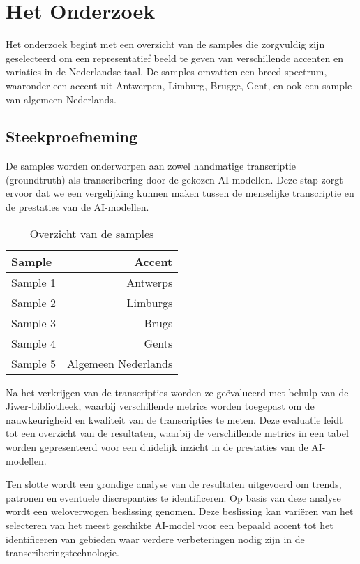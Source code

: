 
\chapter{Het Onderzoek}%
\label{ch:onderzoek}


Het onderzoek begint met een overzicht van de samples die zorgvuldig zijn geselecteerd om een representatief beeld te geven van verschillende accenten en variaties in de Nederlandse taal. De samples omvatten een breed spectrum, waaronder een accent uit Antwerpen, Limburg, Brugge, Gent, en ook een sample van algemeen Nederlands.
\section{Steekproefneming}
De samples worden onderworpen aan zowel handmatige transcriptie (groundtruth) als transcribering door de gekozen AI-modellen. Deze stap zorgt ervoor dat we een vergelijking kunnen maken tussen de menselijke transcriptie en de prestaties van de AI-modellen.

\begin{table}[htbp]
    \centering
    \caption{Overzicht van de samples}
    \label{tab:samples}
    \begin{tabular}{l||r}
        \hline
        \toprule
        Sample & Accent \\ \midrule
        Sample 1 & Antwerps \\
        Sample 2 & Limburgs \\
        Sample 3 & Brugs \\
        Sample 4 & Gents \\
        Sample 5 & Algemeen Nederlands \\ \bottomrule
    \end{tabular}
\end{table}


Na het verkrijgen van de transcripties worden ze geëvalueerd met behulp van de Jiwer-bibliotheek, waarbij verschillende metrics worden toegepast om de nauwkeurigheid en kwaliteit van de transcripties te meten. Deze evaluatie leidt tot een overzicht van de resultaten, waarbij de verschillende metrics in een tabel worden gepresenteerd voor een duidelijk inzicht in de prestaties van de AI-modellen.

Ten slotte wordt een grondige analyse van de resultaten uitgevoerd om trends, patronen en eventuele discrepanties te identificeren. Op basis van deze analyse wordt een weloverwogen beslissing genomen. Deze beslissing kan variëren van het selecteren van het meest geschikte AI-model voor een bepaald accent tot het identificeren van gebieden waar verdere verbeteringen nodig zijn in de transcriberingstechnologie.

